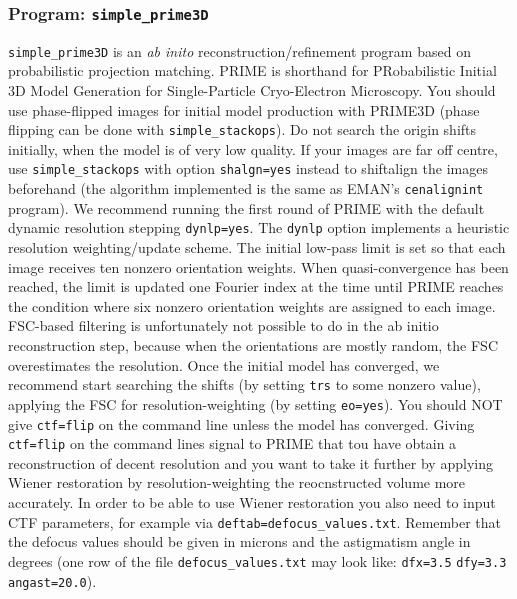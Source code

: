 \documentclass[a4paper,11pt]{article}
\newcommand{\prgname}[1]{\textcolor{NavyBlue}{\texttt{#1}}}
\begin{document}
\subsubsection{Program: \prgname{simple\_prime3D}}
\label{prime3D}
\prgname{simple\_prime3D} is an \textit{ab inito} reconstruction/refinement program based on probabilistic projection matching. PRIME is shorthand for PRobabilistic Initial 3D Model Generation for Single-Particle Cryo-Electron Microscopy. You should use phase-flipped images for initial model production with PRIME3D (phase flipping can be done with \prgname{simple\_stackops}). Do not search the origin shifts initially, when the model is of very low quality. If your images are far off centre, use \prgname{simple\_stackops} with option \texttt{shalgn=yes} instead to shiftalign the images beforehand (the algorithm implemented is the same as EMAN's \texttt{cenalignint} program). We recommend running the first round of PRIME with the default dynamic resolution stepping \texttt{dynlp=yes}. The \texttt{dynlp} option implements a heuristic resolution weighting/update scheme. The initial low-pass limit is set so that each image receives ten nonzero orientation weights. When quasi-convergence has been reached, the limit is updated one Fourier index at the time until PRIME reaches the condition where six nonzero orientation weights are assigned to each image. FSC-based filtering is unfortunately not possible to do in the ab initio reconstruction step, because when the orientations are mostly random, the FSC overestimates the resolution. Once the initial model has converged, we recommend start searching the shifts (by setting \texttt{trs} to some nonzero value), applying the FSC for resolution-weighting (by setting \texttt{eo=yes}). You should NOT give \texttt{ctf=flip} on the command line unless the model has converged. Giving \texttt{ctf=flip} on the command lines signal to PRIME that tou have obtain a reconstruction of decent resolution and you want to take it further by applying Wiener restoration by resolution-weighting the reocnstructed volume more accurately. In order to be able to use Wiener restoration you also need to input CTF parameters, for example via \texttt{deftab=defocus\_values.txt}. Remember that the defocus values should be given in microns and the astigmatism angle in degrees (one row of the file \texttt{defocus\_values.txt} may look like: \texttt{dfx=3.5} \texttt{dfy=3.3} \texttt{angast=20.0}).
\end{document}
